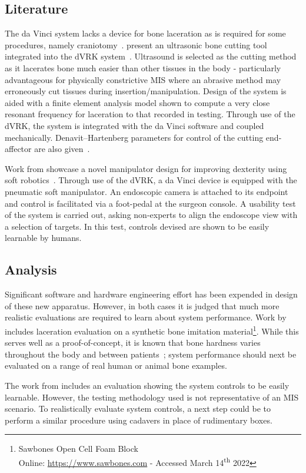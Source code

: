 \documentclass[english]{sobraep}
\begin{document}
\subsection{Literature}
\par{The da Vinci system lacks a device for bone laceration as is required for some procedures, namely craniotomy~\cite{Fernandez-de_Thomas2022-ih}. \citeauthor{bone-cutter} present an ultrasonic bone cutting tool integrated into the dVRK system~\cite{bone-cutter}. Ultrasound is selected as the cutting method as it lacerates bone much easier than other tissues in the body - particularly advantageous for physically constrictive MIS where an abrasive method may erroneously cut tissues during insertion/manipulation. Design of the system is aided with a finite element analysis model shown to compute a very close resonant frequency for laceration to that recorded in testing. Through use of the dVRK, the system is integrated with the da Vinci software and coupled mechanically. Denavit–Hartenberg parameters for control of the cutting end-affector are also given~\cite[Table 3]{bone-cutter}.}
\par{Work from  \citeauthor{soft-manip} showcase a novel manipulator design for improving dexterity using soft robotics~\cite{soft-manip}. Through use of the dVRK, a da Vinci device is equipped with the pneumatic soft manipulator. An endoscopic camera is attached to its endpoint and control  is facilitated via a foot-pedal at the surgeon console. A usability test of the system is carried out, asking non-experts to align the endoscope view with a selection of targets. In this test, controls devised are shown to be easily learnable by humans.}
\subsection{Analysis}
\par{Significant software and hardware engineering effort has been expended in design of these new apparatus.  However, in both cases it is judged that much more realistic evaluations are required to learn about system performance. Work by \citeauthor{bone-cutter} includes laceration evaluation on a synthetic bone imitation material\footnote{Sawbones\textregistered{}  Open Cell Foam Block\\ Online: \url{https://www.sawbones.com} - Accessed March 14\textsuperscript{th} 2022}. While this serves well as a proof-of-concept, it is known that bone hardness varies throughout the body and between patients~\cite{bones-are-hard}; system performance should next be evaluated on a range of real human or animal bone examples. 

The work from \citeauthor{soft-manip} includes an evaluation showing the system controls to be easily learnable. However, the testing methodology used is not representative of an MIS scenario. To realistically evaluate system controls, a next step could be to perform a similar procedure using cadavers in place of rudimentary boxes. }
\end{document}
